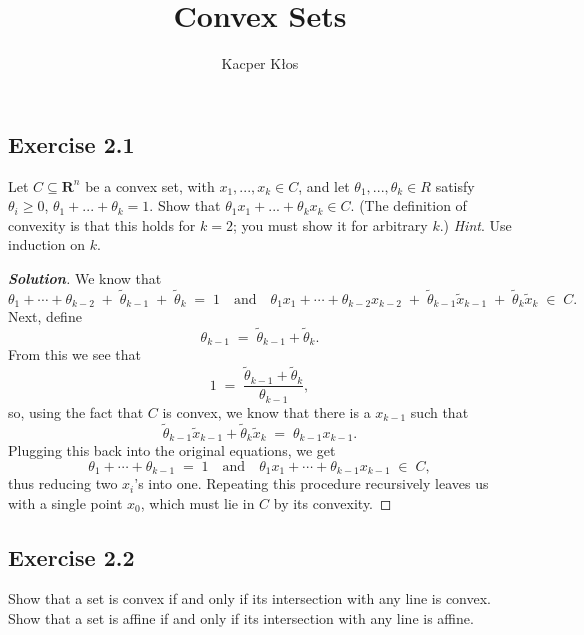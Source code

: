 \documentclass[12pt]{article}
\title{Convex Sets}
\author{Kacper Kłos}
\newenvironment{Solution}
  {\begin{proof}[\textbf{Solution}]}
  {\end{proof}}
\begin{document}
\maketitle

\vspace{0.4in}

\subsection*{Exercise 2.1}
Let $C \subseteq \mathbf{R}^n$ be a convex set, with $x_1, ... , x_k \in C$, and let $\theta_1, ... , \theta_k \in R$ satisfy $\theta_i \geq 0$,
$\theta_1 + ... + \theta_k = 1$. Show that $\theta_1 x_1 + ... + \theta_k x_k \in C$. (The definition of convexity is that
this holds for $k = 2$; you must show it for arbitrary $k$.) \textit{Hint}. Use induction on $k$.
\begin{Solution}
	We know that
	\[
		\theta_1 + \cdots + \theta_{k-2} \;+\; \tilde{\theta}_{k-1} \;+\; \tilde{\theta}_{k}
		\;=\;
		1
		\quad \text{and} \quad
		\theta_1 x_1 + \cdots + \theta_{k-2} x_{k-2} \;+\; \tilde{\theta}_{k-1} \tilde{x}_{k-1} \;+\; \tilde{\theta}_{k} \tilde{x}_{k}
		\;\in\; C.
	\]
	Next, define
	\[
		\theta_{k-1}
		\;=\;
		\tilde{\theta}_{k-1} + \tilde{\theta}_{k}.
	\]
	From this we see that
	\[
		1
		\;=\;
		\frac{\tilde{\theta}_{k-1} + \tilde{\theta}_{k}}{\theta_{k-1}},
	\]
	so, using the fact that \(C\) is convex, we know that there is a \(x_{k-1}\) such that
	\[
		\tilde{\theta}_{k-1} \tilde{x}_{k-1} + \tilde{\theta}_{k} \tilde{x}_{k}
		\;=\;
		\theta_{k-1} x_{k-1}.
	\]
	Plugging this back into the original equations, we get
	\[
		\theta_1 + \cdots + \theta_{k-1} \;=\; 1
		\quad \text{and} \quad
		\theta_1 x_1 + \cdots + \theta_{k-1} x_{k-1} \;\in\; C,
	\]
	thus reducing two \(x_i\)'s into one. Repeating this procedure recursively leaves us with a single point \(x_0\), which must lie in \(C\) by its convexity.
\end{Solution}

\newpage

\subsection*{Exercise 2.2}
Show that a set is convex if and only if its intersection with any line is convex. Show that
a set is affine if and only if its intersection with any line is affine.
\end{document}

